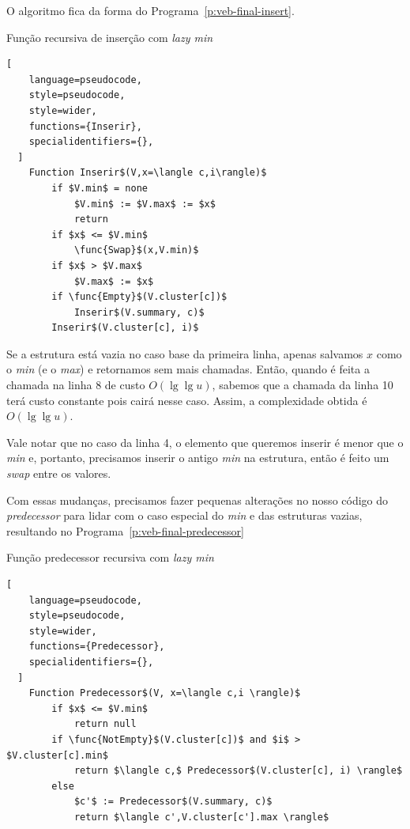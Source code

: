 O algoritmo fica da forma do Programa~\ref{p:veb-final-insert}.

\begin{programruledcaption}{Função recursiva de inserção com \emph{lazy min} \label{p:veb-final-insert}}
  \begin{lstlisting}[
    language=pseudocode,
    style=pseudocode,
    style=wider,
    functions={Inserir},
    specialidentifiers={},
  ]
    Function Inserir$(V,x=\langle c,i\rangle)$
        if $V.min$ = none
            $V.min$ := $V.max$ := $x$
            return
        if $x$ <= $V.min$
            \func{Swap}$(x,V.min)$
        if $x$ > $V.max$
            $V.max$ := $x$
        if \func{Empty}$(V.cluster[c])$
            Inserir$(V.summary, c)$
        Inserir$(V.cluster[c], i)$
  \end{lstlisting}
\end{programruledcaption}

Se a estrutura está vazia no caso base da primeira linha, apenas salvamos $x$
como o \textit{min} (e o \textit{max}) e retornamos sem mais chamadas. Então,
quando é feita a chamada na linha 8 de custo $O(\lg \lg u)$, sabemos que a
chamada da linha 10 terá custo constante pois cairá nesse caso. Assim, a
complexidade obtida é $O(\lg \lg u)$.

Vale notar que no caso da linha 4, o elemento que queremos inserir é menor que o
\textit{min} e, portanto, precisamos inserir o antigo \textit{min} na estrutura,
então é feito um \textit{swap} entre os valores.  

Com essas mudanças, precisamos fazer pequenas alterações no nosso código do
\textit{predecessor} para lidar com o caso especial do \textit{min} e das
estruturas vazias, resultando no Programa~\ref{p:veb-final-predecessor}

\begin{programruledcaption}{Função predecessor recursiva com \emph{lazy min} \label{p:veb-final-predecessor}}
  \begin{lstlisting}[
    language=pseudocode,
    style=pseudocode,
    style=wider,
    functions={Predecessor},
    specialidentifiers={},
  ]
    Function Predecessor$(V, x=\langle c,i \rangle)$
        if $x$ <= $V.min$
            return null
        if \func{NotEmpty}$(V.cluster[c])$ and $i$ > $V.cluster[c].min$
            return $\langle c,$ Predecessor$(V.cluster[c], i) \rangle$
        else
            $c'$ := Predecessor$(V.summary, c)$
            return $\langle c',V.cluster[c'].max \rangle$
  \end{lstlisting}
\end{programruledcaption}

